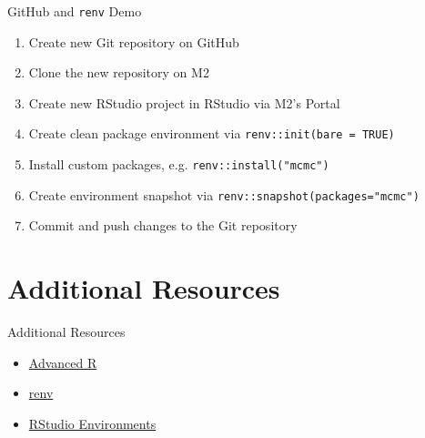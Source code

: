 \documentclass[aspectratio=169]{beamer}
\begin{document}
\begin{frame}{GitHub and \texttt{renv} Demo}
\begin{enumerate}
\item Create new Git repository on GitHub
\item Clone the new repository on M2
\item Create new RStudio project in RStudio via M2's Portal
\item Create clean package environment via \texttt{renv::init(bare = TRUE)}
\item Install custom packages, e.g. \texttt{renv::install("mcmc")}
\item Create environment snapshot via \texttt{renv::snapshot(packages="mcmc")}
\item Commit and push changes to the Git repository
\end{enumerate}

\end{frame}

\section{Additional Resources}

\begin{frame}{Additional Resources}
\begin{itemize}
\item \href{https://adv-r.hadley.nz/index.html}{Advanced R}
\item \href{https://rstudio.github.io/renv/index.html}{renv}
\item \href{https://environments.rstudio.com}{RStudio Environments}
\end{itemize}
\end{frame}


\end{document}
